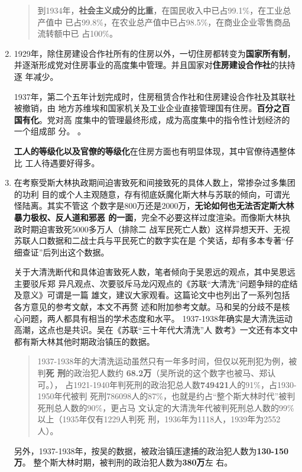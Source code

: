 \begin{enumerate}
\begin{quotation}
    到1934年，\textbf{社会主义成分的比重}，在国民收入中已占99.1\%，在工业总产值中
    已占99.8\%，在农业总产值中已占98.5\%，在商业企业零售商品流转额中已
    占100\%。
  \end{quotation}

\item 1929年，除住房建设合作社所有的住房以外，一切住房都转变为\textbf{国家所有制}，
  并逐渐形成党对住房事业的高度集中管理。并且国家对\textbf{住房建设合作社}的扶持逐
  年减少。

  1937年，第二个五年计划完成时，住房租赁合作社和住房建设合作社及其联社被撤销，由
  地方苏维埃和国家机关及工业企业直接管理国有住房。\textbf{百分之百国有化}。党对高
  度集中的管理最终形成，成为高度集中的指令性计划经济的一个组成部
  分。 。

  \textbf{工人的等级化以及官僚的等级化}在住房方面也有明显体现，其中官僚待遇整体比
  工人待遇要好得多。

\item 在考察受斯大林执政期间迫害致死和间接致死的具体人数上，常掺杂过多集团的功利
  目的或个人主观随意，存有彻底妖魔化斯大林与苏联的倾向，可谓光怪陆离。其实不管这
  个数字是800万还是2000万，\textbf{无论如何也无法否定斯大林暴力极权、反人道和邪恶
    的一面}，完全不必要这样过度渲染。而像斯大林执政时期迫害致死5000多万人（排除二
  战军民死亡人数）这样异想天开、无视苏联人口数据和二战士兵与平民死亡的数字实在是
  个笑话，却有多本专著``仔细查证''后列出这个数据。

  关于大清洗断代和具体迫害致死人数，笔者倾向于吴恩远的观点，其中吴恩远主要驳斥郑
  异凡观点、次要驳斥马龙闪观点的《苏联``大清洗''问题争辩的症结及意义》可谓是一篇
  雄文，建议大家观看。这篇论文中也列出了一系列包括各方意见的参考文献，本文不再赘
  述和附加参考文献。马和吴的分歧不是核心问题，两人都具有相当的学术态度和水平。
  1937-1938年确实是大清洗运动高潮，这点也是共识。吴在《苏联``三十年代大清洗''人
  数考》一文还有本文中都有斯大林其他时期政治镇压的数据。
  \begin{quotation}
    1937-1938年的大清洗运动虽然只有一年多时间，但仅以死刑犯为例，被判\textbf{死
      刑}的政治犯人数约 \textbf{68.2万}（吴所说的这个数字也被马、郑认可。），
    占1921-1940年判死刑的政治犯总人数\textbf{749421}人的91\%，占1930-1950年代被判
    死刑786098人的87\%，也就是约占“整个斯大林时代”被判死刑总人数的90\%，更占马
    文认定的大清洗年代被判死刑总人数的99\%以上（1935年仅有1229人判死
    刑，1936年为1118人，1939年为2552人）。
  \end{quotation}
  另外，1937-1938年，按吴的数据，被政治镇压逮捕的政治犯人数为\textbf{130-150万}。
  整个斯大林时期，被判刑的政治犯人数为\textbf{380万}左
  右。\cite{wuenyuanzhengbian}


\end{enumerate}
